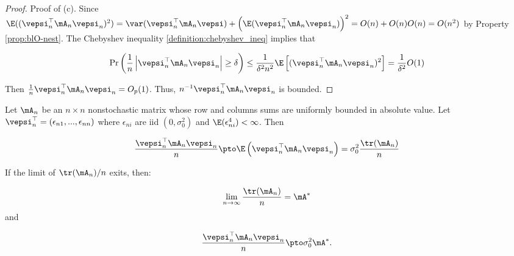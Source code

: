 \documentclass[english,12pt]{book}\usepackage[]{graphicx}\usepackage[]{xcolor}
\begin{document}
\begin{proof}
Proof of (c). Since $\E((\vepsi_n^\top\mA_n\vepsi_n)^2)= \var(\vepsi_n^\top\mA_n\vepsi) +  \left(\E(\vepsi_n^\top\mA_n\vepsi_n)\right)^2 = O(n) + O(n)O(n)= O(n^2)$ by Property \ref{prop:blO-nest}. The Chebyshev inequality \ref{definition:chebyshev_ineq} implies that

\begin{equation*}
\Pr\left(\frac{1}{n}\left|\vepsi_n^\top\mA_n\vepsi_n\right| \geq \delta\right) \leq \frac{1}{\delta^2n^2}\E\left[(\vepsi_n^\top\mA_n\vepsi_n)^2\right] = \frac{1}{\delta^2}O(1)
\end{equation*}

Then $\frac{1}{n}\vepsi^\top_n\mA_n\vepsi_n = O_p(1)$. Thus, $n^{-1}\vepsi_n^\top\mA_n\vepsi_n$ is bounded. 
\end{proof}

\begin{theorem}\label{teo:quadratic-forms-ley}
Let $\mA_n$ be an $n\times n$ nonstochastic matrix whose row and columns sums are uniformly bounded in absolute value. Let $\vepsi^{\top}_n=(\epsilon_{n1}, ..., \epsilon_{nn})$ where $\epsilon_{ni}$ are iid $(0, \sigma^2_0)$ and $\E(\epsilon_{ni}^4)<\infty$. Then

\begin{equation*}
  \frac{\vepsi_n^\top \mA_n \vepsi_n}{n}\pto \E\left(\vepsi_n^\top \mA_n \vepsi_n\right) = \sigma^2_0\frac{\tr(\mA_n)}{n}
\end{equation*}

If the limit of $\tr(\mA_n)/n$ exits, then:

\begin{equation*}
\lim_{n\to\infty}\frac{\tr(\mA_n)}{n} = \mA^*
\end{equation*}
%
and

\begin{equation*}
  \frac{\vepsi_n^\top \mA_n \vepsi_n}{n}\pto \sigma^2_0\mA^*.
\end{equation*}
\end{theorem}
\end{document}
